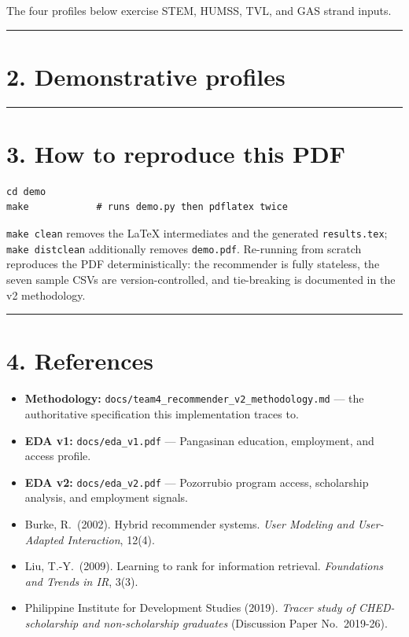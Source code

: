 \documentclass[11pt,a4paper]{article}
\begin{document}
\noindent
The four profiles below exercise STEM, HUMSS, TVL, and GAS strand inputs.

\vspace{0.5em}
\hrule
\vspace{0.5em}

\section*{2. Demonstrative profiles}



\vspace{1em}
\hrule
\vspace{0.5em}

\section*{3. How to reproduce this PDF}

\begin{verbatim}
cd demo
make            # runs demo.py then pdflatex twice
\end{verbatim}

\noindent
\texttt{make clean} removes the LaTeX intermediates and the generated
\texttt{results.tex}; \texttt{make distclean} additionally removes
\texttt{demo.pdf}. Re-running from scratch reproduces the PDF
deterministically: the recommender is fully stateless, the seven
sample CSVs are version-controlled, and tie-breaking is documented
in the v2 methodology.

\vspace{0.5em}
\hrule
\vspace{0.5em}

\section*{4. References}

\begin{itemize}\setlength\itemsep{0.15em}
  \item \textbf{Methodology:} \texttt{docs/team4\_recommender\_v2\_methodology.md}
        --- the authoritative specification this implementation traces to.
  \item \textbf{EDA v1:} \texttt{docs/eda\_v1.pdf} --- Pangasinan
        education, employment, and access profile.
  \item \textbf{EDA v2:} \texttt{docs/eda\_v2.pdf} --- Pozorrubio
        program access, scholarship analysis, and employment signals.
  \item Burke, R.\ (2002). Hybrid recommender systems.
        \emph{User Modeling and User-Adapted Interaction}, 12(4).
  \item Liu, T.-Y.\ (2009). Learning to rank for information
        retrieval. \emph{Foundations and Trends in IR}, 3(3).
  \item Philippine Institute for Development Studies (2019).
        \emph{Tracer study of CHED-scholarship and non-scholarship
        graduates} (Discussion Paper No.\ 2019-26).
\end{itemize}
\end{document}
